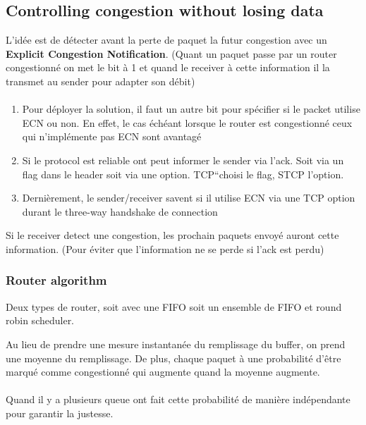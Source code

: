 \documentclass{report}
\begin{document}
\subsection{Controlling congestion without losing data}
L'idée est de détecter avant la perte de paquet la futur congestion avec un 
\textbf{Explicit Congestion Notification}. (Quant un paquet passe par un router 
congestionné on met le bit à 1 et quand le receiver à cette information il la
transmet au sender pour adapter son débit)

\paragraph{}
\begin{enumerate}
    \item Pour déployer la solution, il faut un autre bit pour spécifier si le packet utilise
        ECN ou non. En effet, le cas échéant lorsque le router est congestionné ceux qui 
        n'implémente pas ECN sont avantagé
    \item Si le protocol est reliable ont peut informer le sender via l'ack. Soit via
        un flag dans le header soit via une option. TCP``choisi le flag, STCP l'option.
    \item Dernièrement, le sender/receiver savent si il utilise ECN via une TCP option
        durant le three-way handshake de connection
\end{enumerate}

Si le receiver detect une congestion, les prochain paquets envoyé auront cette information. 
(Pour éviter que l'information ne se perde si l'ack est perdu)

\subsubsection{Router algorithm}
Deux types de router, soit avec une FIFO soit un ensemble de FIFO et round robin scheduler.

Au lieu de prendre une mesure instantanée du remplissage du buffer, on prend une moyenne
du remplissage.
De plus, chaque paquet à une probabilité d'être marqué comme congestionné qui augmente
quand la moyenne augmente.

\paragraph{}
Quand il y a plusieurs queue ont fait cette probabilité de manière indépendante pour
garantir la justesse.
\end{document}
